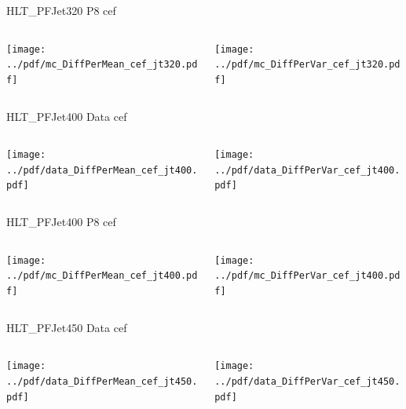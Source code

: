 \documentclass[9pt]{beamer}
\begin{document}
\begin{frame}[t]{HLT\_PFJet320 P8 cef}
\begin{columns}[T]
  \begin{column}{.5\textwidth}
  \texttt{[image: ../pdf/mc\_DiffPerMean\_cef\_jt320.pdf]}
  \end{column}
  \begin{column}{.5\textwidth}
  \texttt{[image: ../pdf/mc\_DiffPerVar\_cef\_jt320.pdf]}
  \end{column}
\end{columns}
\end{frame}

\begin{frame}[t]{HLT\_PFJet400 Data cef}
\begin{columns}[T]
  \begin{column}{.5\textwidth}
  \texttt{[image: ../pdf/data\_DiffPerMean\_cef\_jt400.pdf]}
  \end{column}
  \begin{column}{.5\textwidth}
  \texttt{[image: ../pdf/data\_DiffPerVar\_cef\_jt400.pdf]}
  \end{column}
\end{columns}
\end{frame}

\begin{frame}[t]{HLT\_PFJet400 P8 cef}
\begin{columns}[T]
  \begin{column}{.5\textwidth}
  \texttt{[image: ../pdf/mc\_DiffPerMean\_cef\_jt400.pdf]}
  \end{column}
  \begin{column}{.5\textwidth}
  \texttt{[image: ../pdf/mc\_DiffPerVar\_cef\_jt400.pdf]}
  \end{column}
\end{columns}
\end{frame}

\begin{frame}[t]{HLT\_PFJet450 Data cef}
\begin{columns}[T]
  \begin{column}{.5\textwidth}
  \texttt{[image: ../pdf/data\_DiffPerMean\_cef\_jt450.pdf]}
  \end{column}
  \begin{column}{.5\textwidth}
  \texttt{[image: ../pdf/data\_DiffPerVar\_cef\_jt450.pdf]}
  \end{column}
\end{columns}
\end{frame}
\end{document}
